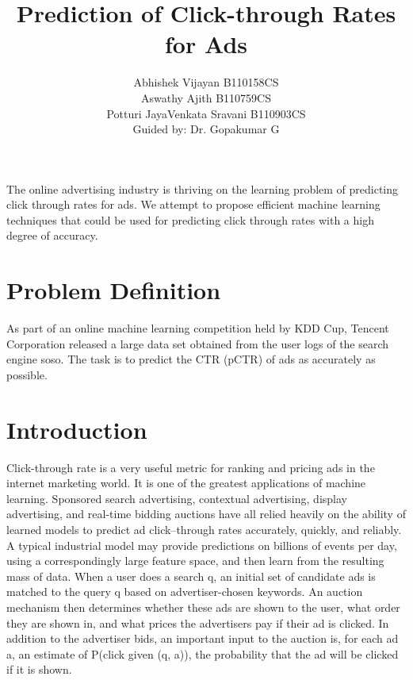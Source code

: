 \documentclass[10pt]{article}
\title{Prediction of Click-through Rates for Ads}
\author{ Abhishek Vijayan     B110158CS\\  Aswathy Ajith     B110759CS\\  Potturi JayaVenkata Sravani    B110903CS\\  Guided by: Dr. Gopakumar G}
\begin{document}
	
\maketitle
	

\abstract{} 
The online advertising industry is thriving on the learning problem of predicting click through rates for ads. We attempt to propose efficient machine learning techniques that could be used for predicting click through rates with a high degree of accuracy.
\section{Problem Definition}
As part of an online machine learning competition held by KDD Cup, Tencent Corporation released a large data set obtained from the user logs of the search engine soso. The task is to predict the CTR (pCTR) of ads as accurately as possible.
\section{Introduction}
Click-through rate is a very useful metric for ranking and pricing ads in the internet marketing world. It is one of the greatest applications of machine learning. Sponsored search advertising, contextual advertising, display advertising, and real-time bidding auctions have all relied heavily on the ability of learned models to predict ad click–through rates accurately, quickly, and reliably.  A typical industrial model may provide predictions on billions of events per day, using a correspondingly large feature space, and then learn from the resulting mass of data. When a user does a search q, an initial set of candidate ads is matched to the query q based on advertiser-chosen keywords. An auction mechanism then determines whether these ads are shown to the user, what order they are shown in, and what prices the advertisers pay if their ad is clicked. In addition to the advertiser bids, an important input to the auction is, for each ad a, an estimate of P(click given (q, a)), the probability that the ad will be clicked if it is shown.
\end{document}
